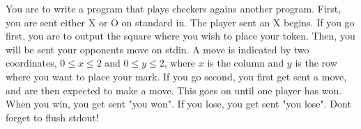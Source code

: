 
You are to write a program that plays checkers agains another program. First, you are sent either X or O on standard in. The player sent an X begins. If you go first, you are to output the square where you wish to place your token. Then, you will be sent your opponents move on stdin. A move is indicated by two coordinates, $0\leq x\leq 2$ and $0\leq y\leq 2$, where $x$ is the column and $y$ is the row where you want to place your mark. If you go second, you first get sent a move, and are then expected to make a move. This goes on until one player has won. When you win, you get sent "you won". If you lose, you get sent "you lose". Dont forget to flush stdout!
